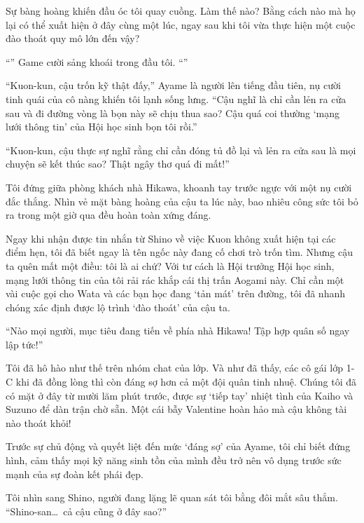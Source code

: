 \documentclass[../main.tex]{subfiles}
\begin{document}
Sự bàng hoàng khiến đầu óc tôi quay cuồng. Làm thế nào? Bằng cách nào mà họ lại có thể xuất hiện ở đây cùng một lúc, ngay sau khi tôi vừa thực hiện một cuộc đào thoát quy mô lớn đến vậy?

``'' Game cười sảng khoái trong đầu tôi. ``''

``Kuon-kun, cậu trốn kỹ thật đấy,'' Ayame là người lên tiếng đầu tiên, nụ cười tinh quái của cô nàng khiến tôi lạnh sống lưng. ``Cậu nghĩ là chỉ cần lẻn ra cửa sau và đi đường vòng là bọn này sẽ chịu thua sao? Cậu quá coi thường `mạng lưới thông tin' của Hội học sinh bọn tôi rồi.''


``Kuon-kun, cậu thực sự nghĩ rằng chỉ cần đóng tủ đồ lại và lẻn ra cửa sau là mọi chuyện sẽ kết thúc sao? Thật ngây thơ quá đi mất!''

Tôi đứng giữa phòng khách nhà Hikawa, khoanh tay trước ngực với một nụ cười đắc thắng. Nhìn vẻ mặt bàng hoàng của cậu ta lúc này, bao nhiêu công sức tôi bỏ ra trong một giờ qua đều hoàn toàn xứng đáng.

Ngay khi nhận được tin nhắn từ Shino về việc Kuon không xuất hiện tại các điểm hẹn, tôi đã biết ngay là tên ngốc này đang cố chơi trò trốn tìm. Nhưng cậu ta quên mất một điều: tôi là ai chứ? Với tư cách là Hội trưởng Hội học sinh, mạng lưới thông tin của tôi rải rác khắp cái thị trấn Aogami này. Chỉ cần một vài cuộc gọi cho Wata và các bạn học đang `tản mát' trên đường, tôi đã nhanh chóng xác định được lộ trình `đào thoát' của cậu ta.

``Nào mọi người, mục tiêu đang tiến về phía nhà Hikawa! Tập hợp quân số ngay lập tức!''

Tôi đã hô hào như thế trên nhóm chat của lớp. Và như đã thấy, các cô gái lớp 1-C khi đã đồng lòng thì còn đáng sợ hơn cả một đội quân tinh nhuệ. Chúng tôi đã có mặt ở đây từ mười lăm phút trước, được sự `tiếp tay' nhiệt tình của Kaiho và Suzuno để dàn trận chờ sẵn. Một cái bẫy Valentine hoàn hảo mà cậu không tài nào thoát khỏi!


Trước sự chủ động và quyết liệt đến mức `đáng sợ' của Ayame, tôi chỉ biết đứng hình, cảm thấy mọi kỹ năng sinh tồn của mình đều trở nên vô dụng trước sức mạnh của sự đoàn kết phái đẹp.

Tôi nhìn sang Shino, người đang lặng lẽ quan sát tôi bằng đôi mắt sâu thẳm. ``Shino-san\dots\ cả cậu cũng ở đây sao?''
\end{document}
